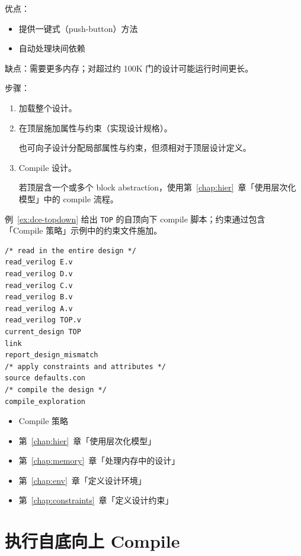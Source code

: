 优点：
\begin{itemize}
  \item 提供一键式（push-button）方法
  \item 自动处理块间依赖
\end{itemize}

缺点：需要更多内存；对超过约 100K 门的设计可能运行时间更长。

步骤：
\begin{enumerate}
  \item 加载整个设计。
  \item 在顶层施加属性与约束（实现设计规格）。
\begin{noteBox}
也可向子设计分配局部属性与约束，但须相对于顶层设计定义。
\end{noteBox}
  \item Compile 设计。
\begin{noteBox}
若顶层含一个或多个 block abstraction，使用第~\ref{chap:hier}~章「使用层次化模型」中的 compile 流程。
\end{noteBox}
\end{enumerate}

例~\ref{ex:dce-topdown} 给出 \texttt{TOP} 的自顶向下 compile 脚本；约束通过包含「Compile 策略」示例中的约束文件施加。

\begin{lstlisting}[caption={自顶向下 Compile 脚本},label={ex:dce-topdown}]
/* read in the entire design */
read_verilog E.v
read_verilog D.v
read_verilog C.v
read_verilog B.v
read_verilog A.v
read_verilog TOP.v
current_design TOP
link
report_design_mismatch
/* apply constraints and attributes */
source defaults.con
/* compile the design */
compile_exploration
\end{lstlisting}

\begin{seeAlsoBox}
\begin{itemize}
  \item Compile 策略
  \item 第~\ref{chap:hier}~章「使用层次化模型」
  \item 第~\ref{chap:memory}~章「处理内存中的设计」
  \item 第~\ref{chap:env}~章「定义设计环境」
  \item 第~\ref{chap:constraints}~章「定义设计约束」
\end{itemize}
\end{seeAlsoBox}

\section{执行自底向上 Compile}
